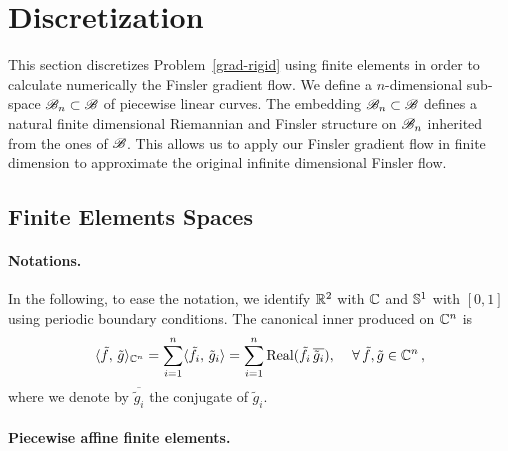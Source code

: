\section{Discretization}
\label{discretization}

This section discretizes Problem~\eqref{grad-rigid} using finite elements in order to calculate numerically the Finsler gradient flow. We define a $n$-dimensional sub-space $\mathcal{B}_n \subset \mathcal{B}$ of piecewise linear curves. The embedding $\mathcal{B}_n \subset \mathcal{B}$ defines a natural finite dimensional Riemannian and Finsler structure on $\mathcal{B}_n$ inherited from the ones of $\mathcal{B}$. This allows us to apply our Finsler gradient flow in finite dimension to approximate the original infinite dimensional Finsler flow. 


\subsection{Finite Elements Spaces}

\paragraph{Notations.}

In the following, to ease the notation, we identify $\mathbb{R}^2$ with $\mathbb{C}$ and $\mathbb{S}^1$ with $[0,1]$ using periodic boundary conditions.  
The canonical inner produced on $\mathbb{C}^n$ is
\begin{equation}\label{scalarC}
	\langle \tilde{f},\,\tilde{g}\rangle_{\mathbb{C}^n} = 
	\sum_{i=1}^n \langle \tilde{f}_i,\,\tilde{g}_i\rangle
	=
	\sum_{i=1}^n {\rm Real}(\tilde{f}_i \,\overline{\tilde{g}_i}), 
	\,\quad \forall \, \tilde{f}, \tilde{g} \in\mathbb{C}^n \,,
\end{equation}
where we denote by $\overline{\tilde{g}_i}$ the conjugate of $\tilde{g}_i$.

\paragraph{Piecewise affine finite elements.}

